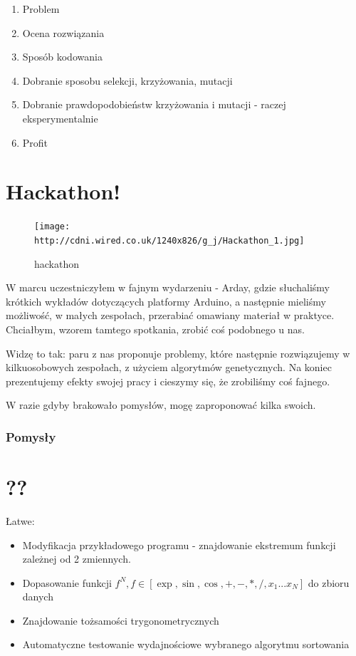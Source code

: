 \documentclass{article}
\begin{document}
\begin{enumerate}[1.]
\item
  Problem
\item
  Ocena rozwiązania
\item
  Sposób kodowania
\item
  Dobranie sposobu selekcji, krzyżowania, mutacji
\item
  Dobranie prawdopodobieństw krzyżowania i mutacji - raczej
  eksperymentalnie
\item
  Profit
\end{enumerate}

    \section{Hackathon!}

\begin{figure}[htbp]
\centering
\texttt{[image: http://cdni.wired.co.uk/1240x826/g\_j/Hackathon\_1.jpg]}
\caption{hackathon}
\end{figure}

    W marcu uczestniczyłem w fajnym wydarzeniu - Arday, gdzie słuchaliśmy
krótkich wykładów dotyczących platformy Arduino, a następnie mieliśmy
możliwość, w małych zespołach, przerabiać omawiany materiał w praktyce.
Chciałbym, wzorem tamtego spotkania, zrobić coś podobnego u nas.

Widzę to tak: paru z nas proponuje problemy, które następnie
rozwiązujemy w kilkuosobowych zespołach, z użyciem algorytmów
genetycznych. Na koniec prezentujemy efekty swojej pracy i cieszymy się,
że zrobiliśmy coś fajnego.

W razie gdyby brakowało pomysłów, mogę zaproponować kilka swoich.

    \subsubsection{Pomysły}

\section{??}

    Łatwe:

\begin{itemize}
\item
  Modyfikacja przykładowego programu - znajdowanie ekstremum funkcji
  zależnej od 2 zmiennych.
\item
  Dopasowanie funkcji
  $f^N, f \in [\exp, \sin, \cos, +, -, *, /, x_1 ... x_N]$ do zbioru
  danych
\item
  Znajdowanie tożsamości trygonometrycznych
\item
  Automatyczne testowanie wydajnościowe wybranego algorytmu sortowania
\end{itemize}
\end{document}
